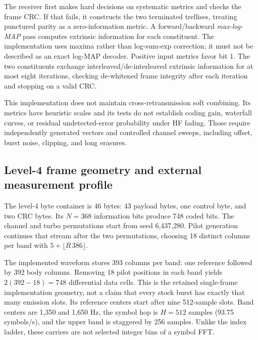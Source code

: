 
The receiver first makes hard decisions on systematic metrics and checks the
frame CRC. If that fails, it constructs the two terminated trellises, treating
punctured parity as a zero-information metric. A forward/backward
\emph{max-log-MAP} pass computes extrinsic information for each constituent.
The implementation uses maxima rather than log-sum-exp correction; it must
not be described as an exact log-MAP decoder. Positive input metrics favor
bit 1. The two constituents exchange interleaved/de-interleaved extrinsic
information for at most eight iterations, checking de-whitened frame integrity
after each iteration and stopping on a valid CRC.

This implementation does not maintain cross-retransmission soft combining.
Its metrics have heuristic scales and its tests do not establish coding gain,
waterfall curves, or residual undetected-error probability under HF fading.
Those require independently generated vectors and controlled channel sweeps,
including offset, burst noise, clipping, and long erasures.

\subsection{Level-4 frame geometry and external measurement profile}
The level-4 byte container is 46 bytes: 43 payload bytes, one control byte,
and two CRC bytes. Its $N=368$ information bits produce 748 coded bits. The
channel and turbo permutations start from seed 6,437,280. Pilot generation
continues that stream after the two permutations, choosing 18 distinct columns
per band with $5+\lfloor R\,386\rfloor$.

The implemented waveform stores 393 columns per band: one reference followed
by 392 body columns. Removing 18 pilot positions in each band yields
$2(392-18)=748$ differential data cells. This is the retained single-frame
implementation geometry, not a claim that every stock burst has exactly that
many emission slots. Its reference centers start after nine 512-sample slots.
Band centers are 1,350 and 1,650 Hz, the symbol hop is $H=512$ samples
(93.75 symbols/s), and the upper band is staggered by 256 samples. Unlike the
index ladder, these carriers are not selected integer bins of a symbol FFT.

